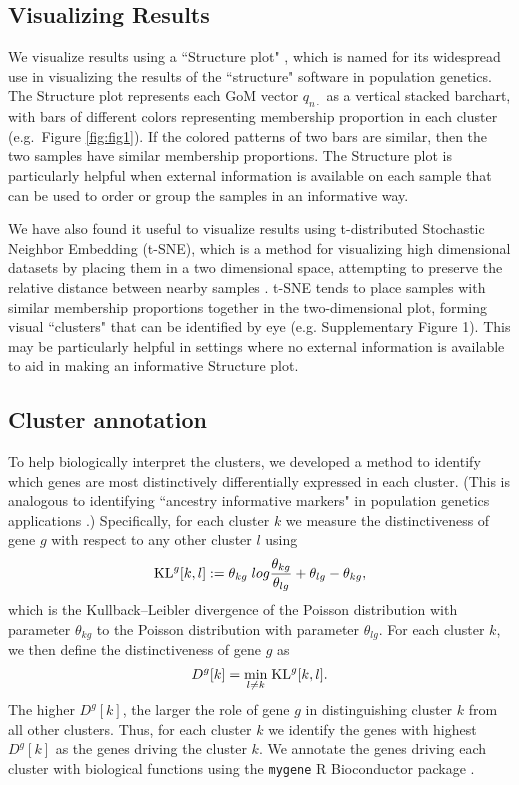 \subsection{Visualizing Results}

We visualize results using a ``Structure plot" \cite{Rosenberg2002}, 
which is named for its widespread use in visualizing the
results of the ``structure" software \cite{Pritchard2000} in population genetics.
The Structure plot represents each GoM vector $q_{n\cdot}$
as  a vertical stacked barchart, with bars of different colors representing membership proportion in each cluster (e.g.~Figure \ref{fig:fig1}). If the colored patterns of two bars are similar, then the two samples have similar membership proportions.  The Structure plot is particularly helpful when external information is available on each sample that can be used to order or group the samples in an informative way.

We have also found it useful to visualize results using t-distributed Stochastic Neighbor Embedding (t-SNE), which is a method for visualizing high dimensional datasets by placing them in a two dimensional space, attempting to preserve the relative distance between nearby samples \cite{Maaten2014,Maaten2008}. t-SNE tends to place samples with similar membership proportions together in the two-dimensional plot, forming visual ``clusters" that can be identified by eye (e.g. Supplementary Figure 1). This may be particularly helpful in settings where no external information is available to aid in making an informative Structure plot. 


\subsection{Cluster annotation}

To help biologically interpret the clusters, we developed a method to identify which genes are most distinctively differentially expressed in each cluster. 
(This is analogous to identifying ``ancestry informative markers" in population genetics applications \cite{rosenberg2005:PMID16305328}.)
 Specifically, for each cluster $k$ we measure the distinctiveness of gene $g$ with respect to any other cluster $l$ using
\begin{equation}
\text{KL}^{g} [k,l] : = \theta_{kg} \; log \frac{\theta_{kg}}{\theta_{lg}} + \theta_{lg} - \theta_{kg},
\end{equation}
which is the Kullback--Leibler divergence of the Poisson distribution with parameter $\theta_{kg}$ to the Poisson distribution with parameter $\theta_{lg}$. 
For each cluster $k$, we then define the distinctiveness of gene $g$ as 
\begin{equation}
D^{g}[k] = \underset{l \neq k}{\min} \; \text{KL}^{g} [k, l].
\end{equation}
The higher $D^g[k]$, the larger the role of gene $g$ in distinguishing cluster $k$ from all other clusters. 
Thus, for each cluster $k$ we identify the genes with highest $D^{g}[k]$ as the genes driving the cluster $k$. 
We annotate the genes driving each cluster with biological functions using the {\tt mygene} R Bioconductor package  \cite{Thompson2014}.

